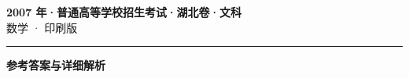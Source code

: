 \documentclass[zihao=5, a4paper]{ctexart}
\begin{document}
\begin{center}
  {\Large\bfseries 2007 年·普通高等学校招生考试·湖北卷·文科}\\[4pt]
  {\large 数学 · 印刷版}
\end{center}
\medskip
{}

\par\bigskip\hrule\bigskip
{}
\begin{center}{\large\bfseries 参考答案与详细解析}\end{center}
\smallskip

\end{document}
